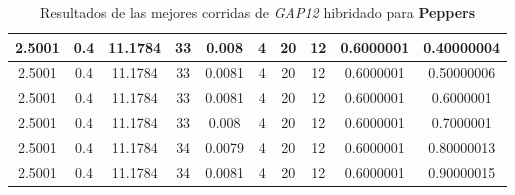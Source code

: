 \begin{table}[h!]
\begin{center}
\begin{tabular}{|c|c|c|c|c|c|c|c|c|c|}
            2.5001 & 0.4  & 11.1784 & 33 & 0.008 & 4 & 20 & 12 & 0.6000001 & 0.40000004\\
        \hline
        \hline
            2.5001 & 0.4  & 11.1784 & 33 & 0.0081 & 4 & 20 & 12 & 0.6000001 & 0.50000006\\
        \hline
        \hline
            2.5001 & 0.4  & 11.1784 & 33 & 0.0081 & 4 & 20 & 12 & 0.6000001 & 0.6000001\\
        \hline
        \hline
            2.5001 & 0.4  & 11.1784 & 33 & 0.008 & 4 & 20 & 12 & 0.6000001 & 0.7000001\\
        \hline
        \hline
            2.5001 & 0.4  & 11.1784 & 34 & 0.0079 & 4 & 20 & 12 & 0.6000001 & 0.80000013\\
        \hline
        \hline
            2.5001 & 0.4  & 11.1784 & 34 & 0.0081 & 4 & 20 & 12 & 0.6000001 & 0.90000015\\
        \hline
        \end{tabular}
        \caption{Resultados de las mejores corridas de \emph{GAP12} hibridado para {\bf Peppers}}
        \label{tb:tableGAP12}
    \end{center}
\end{table}
